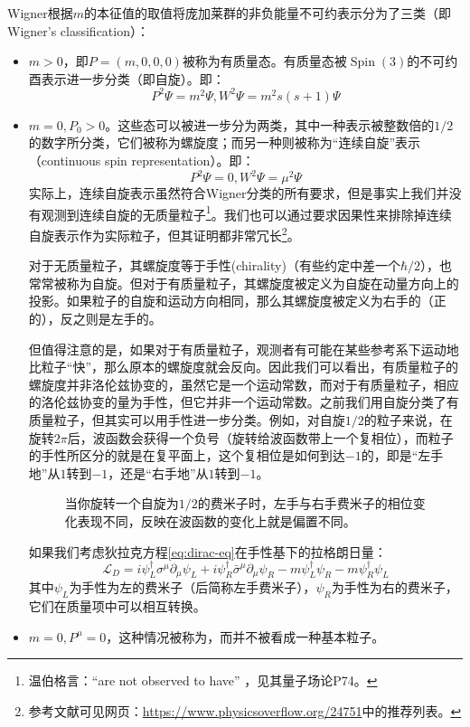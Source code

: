 Wigner根据$m$的本征值的取值将庞加莱群的非负能量不可约表示分为了三类（即Wigner's classification）：
\begin{itemize}
	\item $m>0$，即$P=(m,0,0,0)$被称为有质量态。有质量态被$\operatorname{Spin}(3)$的不可约酉表示进一步分类（即自旋）。即：
	\begin{equation}
		P^2\Psi=m^2\Psi,W^2\Psi=m^2s(s+1)\Psi
	\end{equation}
	\item $m=0,P_0>0$。这些态可以被进一步分为两类，其中一种表示被整数倍的$1/2$的数字所分类，它们被称为螺旋度；而另一种则被称为“连续自旋”表示（continuous spin representation）。即：
	\begin{equation}
		P^2\Psi=0,W^2\Psi=\mu^2\Psi
	\end{equation}
	实际上，连续自旋表示虽然符合Wigner分类的所有要求，但是事实上我们并没有观测到连续自旋的无质量粒子\footnote{温伯格言：``are not observed to have'' ，见其量子场论P74。}。我们也可以通过要求因果性来排除掉连续自旋表示作为实际粒子，但其证明都非常冗长\footnote{参考文献可见网页：\url{https://www.physicsoverflow.org/24751}中的推荐列表。}。
	
	对于无质量粒子，其螺旋度等于手性(chirality)（有些约定中差一个$\hbar/2$），也常常被称为自旋。但对于有质量粒子，其螺旋度被定义为自旋在动量方向上的投影。如果粒子的自旋和运动方向相同，那么其螺旋度被定义为右手的（正的），反之则是左手的。
	
	但值得注意的是，如果对于有质量粒子，观测者有可能在某些参考系下运动地比粒子“快”，那么原本的螺旋度就会反向。因此我们可以看出，有质量粒子的螺旋度并非洛伦兹协变的，虽然它是一个运动常数，而对于有质量粒子，相应的洛伦兹协变的量为手性，但它并非一个运动常数。之前我们用自旋分类了有质量粒子，但其实可以用手性进一步分类。例如，对自旋$1/2$的粒子来说，在旋转$2\pi$后，波函数会获得一个负号（旋转给波函数带上一个复相位），而粒子的手性所区分的就是在复平面上，这个复相位是如何到达$-1$的，即是“左手地”从$1$转到$-1$，还是“右手地”从$1$转到$-1$。
	
	\begin{figure}
		\centering
		
		
		
		\caption{当你旋转一个自旋为$1/2$的费米子时，左手与右手费米子的相位变化表现不同，反映在波函数的变化上就是偏置不同。}
	\end{figure}
	
	如果我们考虑狄拉克方程\eqref{eq:dirac-eq}在手性基下的拉格朗日量：
	\begin{equation}
		\mathcal{L}_{D}=i \psi_{L}^{\dagger} \sigma^{\mu} \partial_{\mu} \psi_{L}+i \psi_{R}^{\dagger} \bar{\sigma}^{\mu} \partial_{\mu} \psi_{R}-m \psi_{L}^{\dagger} \psi_{R}-m \psi_{R}^{\dagger} \psi_{L}
	\end{equation}
	其中$\psi_L$为手性为左的费米子（后简称左手费米子），$\psi_R$为手性为右的费米子，它们在质量项中可以相互转换。
	
	\item  $m=0,P^{\mu}=0$，这种情况被称为，而并不被看成一种基本粒子。
\end{itemize}

